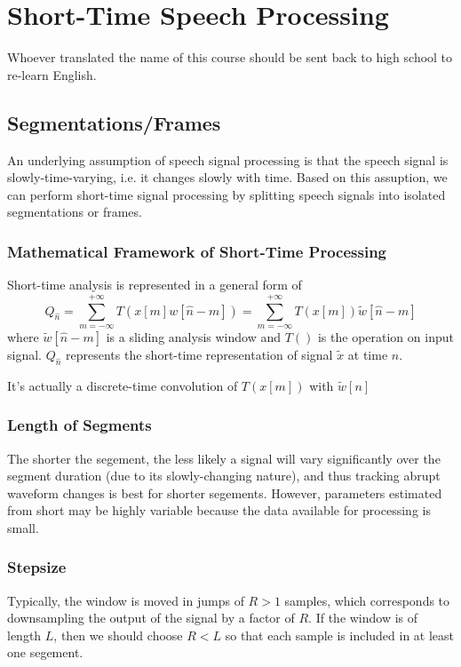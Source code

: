 \chapter{Short-Time Speech Processing}
Whoever translated the name of this course should be sent back to high school to re-learn English.
\newpage

\section{Segmentations/Frames}
An underlying assumption of speech signal processing is that the speech signal is slowly-time-varying, i.e. it changes slowly with time. Based on this assuption, we can perform short-time signal processing by splitting speech signals into isolated segmentations or frames.

\subsection{Mathematical Framework of Short-Time Processing}
Short-time analysis is represented in a general form of
\[ Q_{\hat{n}} = \sum_{m=-\infty}^{+\infty}T(x[m]w[\hat{n}-m]) = \sum_{m=-\infty}^{+\infty}T(x[m])\tilde{w}[\hat{n}-m] \]
where $\tilde{w}[\hat{n}-m]$ is a sliding analysis window and $T()$ is the operation on input signal. $Q_{\hat{n}}$ represents the short-time representation of signal $\tilde{x}$ at time $\hat{n}$.
\begin{remark}
    It's actually a discrete-time convolution of $T(x[m])$ with $\tilde{w}[n]$
\end{remark}

\subsection{Length of Segments}
The shorter the segement, the less likely a signal will vary significantly over the segment duration (due to its slowly-changing nature), and thus tracking abrupt waveform changes is best for shorter segements.
However, parameters estimated from short may be highly variable because the data available for processing is small.

\subsection{Stepsize}
Typically, the window is moved in jumps of $R>1$ samples, which corresponds to downsampling the output of the signal by a factor of $R$. If the window is of length $L$, then we should choose $R<L$ so that each sample is included in at least one segement. 

